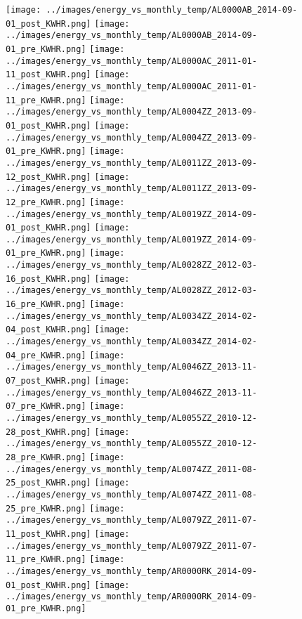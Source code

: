 \begin{figure}
\centering
\texttt{[image: ../images/energy\_vs\_monthly\_temp/AL0000AB\_2014-09-01\_post\_KWHR.png]}
\texttt{[image: ../images/energy\_vs\_monthly\_temp/AL0000AB\_2014-09-01\_pre\_KWHR.png]}
\texttt{[image: ../images/energy\_vs\_monthly\_temp/AL0000AC\_2011-01-11\_post\_KWHR.png]}
\texttt{[image: ../images/energy\_vs\_monthly\_temp/AL0000AC\_2011-01-11\_pre\_KWHR.png]}
\texttt{[image: ../images/energy\_vs\_monthly\_temp/AL0004ZZ\_2013-09-01\_post\_KWHR.png]}
\texttt{[image: ../images/energy\_vs\_monthly\_temp/AL0004ZZ\_2013-09-01\_pre\_KWHR.png]}
\texttt{[image: ../images/energy\_vs\_monthly\_temp/AL0011ZZ\_2013-09-12\_post\_KWHR.png]}
\texttt{[image: ../images/energy\_vs\_monthly\_temp/AL0011ZZ\_2013-09-12\_pre\_KWHR.png]}
\texttt{[image: ../images/energy\_vs\_monthly\_temp/AL0019ZZ\_2014-09-01\_post\_KWHR.png]}
\texttt{[image: ../images/energy\_vs\_monthly\_temp/AL0019ZZ\_2014-09-01\_pre\_KWHR.png]}
\texttt{[image: ../images/energy\_vs\_monthly\_temp/AL0028ZZ\_2012-03-16\_post\_KWHR.png]}
\texttt{[image: ../images/energy\_vs\_monthly\_temp/AL0028ZZ\_2012-03-16\_pre\_KWHR.png]}
\texttt{[image: ../images/energy\_vs\_monthly\_temp/AL0034ZZ\_2014-02-04\_post\_KWHR.png]}
\texttt{[image: ../images/energy\_vs\_monthly\_temp/AL0034ZZ\_2014-02-04\_pre\_KWHR.png]}
\texttt{[image: ../images/energy\_vs\_monthly\_temp/AL0046ZZ\_2013-11-07\_post\_KWHR.png]}
\texttt{[image: ../images/energy\_vs\_monthly\_temp/AL0046ZZ\_2013-11-07\_pre\_KWHR.png]}
\texttt{[image: ../images/energy\_vs\_monthly\_temp/AL0055ZZ\_2010-12-28\_post\_KWHR.png]}
\texttt{[image: ../images/energy\_vs\_monthly\_temp/AL0055ZZ\_2010-12-28\_pre\_KWHR.png]}
\texttt{[image: ../images/energy\_vs\_monthly\_temp/AL0074ZZ\_2011-08-25\_post\_KWHR.png]}
\texttt{[image: ../images/energy\_vs\_monthly\_temp/AL0074ZZ\_2011-08-25\_pre\_KWHR.png]}
\texttt{[image: ../images/energy\_vs\_monthly\_temp/AL0079ZZ\_2011-07-11\_post\_KWHR.png]}
\texttt{[image: ../images/energy\_vs\_monthly\_temp/AL0079ZZ\_2011-07-11\_pre\_KWHR.png]}
\texttt{[image: ../images/energy\_vs\_monthly\_temp/AR0000RK\_2014-09-01\_post\_KWHR.png]}
\texttt{[image: ../images/energy\_vs\_monthly\_temp/AR0000RK\_2014-09-01\_pre\_KWHR.png]}
\end{figure}
